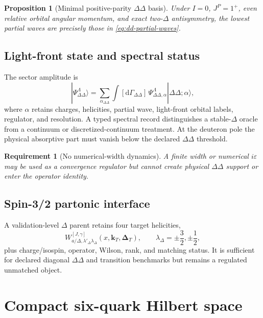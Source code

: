 \documentclass[11pt]{article}
\newtheorem{requirement}[definition]{Requirement}
\newtheorem{proposition}[definition]{Proposition}
\newcommand{\kT}{\bm{k}_{T}}
\newcommand{\DT}{\bm{\Delta}_{T}}
\newcommand{\dd}{\mathrm{d}}
\newcommand{\eps}{\varepsilon}
\begin{document}
\begin{proposition}[Minimal positive-parity \(\Delta\Delta\) basis]
Under \(I=0\), \(J^P=1^+\), even relative orbital angular momentum, and exact two-\(\Delta\) antisymmetry, the lowest partial waves are precisely those in \cref{eq:dd-partial-waves}.
\end{proposition}

\subsection{Light-front state and spectral status}

The sector amplitude is
\begin{equation}
 |\Psi_{\Delta\Delta}^{\Lambda}\rangle
 =\sum_{\alpha_{\Delta\Delta}}
 \int[\dd\Gamma_{\Delta\Delta}]\,
 \Psi_{\Delta\Delta,\alpha}^{\Lambda}
 |\Delta\Delta;\alpha\rangle,
\label{eq:dd-state}
\end{equation}
where \(\alpha\) retains charges, helicities, partial wave, light-front orbital labels, regulator, and resolution.  A typed spectral record distinguishes a stable-\(\Delta\) oracle from a continuum or discretized-continuum treatment.  At the deuteron pole the physical absorptive part must vanish below the declared \(\Delta\Delta\) threshold.

\begin{requirement}[No numerical-width dynamics]
A finite width or numerical \(i\eps\) may be used as a convergence regulator but cannot create physical \(\Delta\Delta\) support or enter the operator identity.
\label{req:dd-no-fake-width}
\end{requirement}

\subsection{Spin-3/2 partonic interface}

A validation-level \(\Delta\) parent retains four target helicities,
\begin{equation}
 W_{a/\Delta,\lambda'_\Delta\lambda_\Delta}^{[J,\gamma]}
 (x,\kT,\DT),
 \qquad
 \lambda_\Delta=\pm\frac32,\pm\frac12,
\label{eq:delta-parton-parent}
\end{equation}
plus charge/isospin, operator, Wilson, rank, and matching status.  It is sufficient for declared diagonal \(\Delta\Delta\) and transition benchmarks but remains a regulated unmatched object.

\section{Compact six-quark Hilbert space}
\label{sec:sixq}
\end{document}
